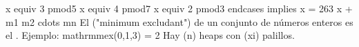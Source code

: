 {}x \markdownRendererBackslash{}equiv 3 \markdownRendererBackslash{}pmod\markdownRendererLeftBrace{}5\markdownRendererRightBrace{} \markdownRendererBackslash{}\markdownRendererBackslash{}\markdownRendererSoftLineBreak
{}x \markdownRendererBackslash{}equiv 4 \markdownRendererBackslash{}pmod\markdownRendererLeftBrace{}7\markdownRendererRightBrace{} \markdownRendererBackslash{}\markdownRendererBackslash{}\markdownRendererSoftLineBreak
{}x \markdownRendererBackslash{}equiv 2 \markdownRendererBackslash{}pmod\markdownRendererLeftBrace{}3\markdownRendererRightBrace{}\markdownRendererSoftLineBreak
{}\markdownRendererBackslash{}end\markdownRendererLeftBrace{}cases\markdownRendererRightBrace{}\markdownRendererSoftLineBreak
{}\markdownRendererBackslash{}implies\markdownRendererSoftLineBreak
{}x = 263\markdownRendererSoftLineBreak
{}\markdownRendererDollarSign{}\markdownRendererDollarSign{}\markdownRendererParagraphSeparator
{}\markdownRendererParagraphSeparator
{}\markdownRendererDollarSign{}\markdownRendererDollarSign{}\markdownRendererSoftLineBreak
{}x + m\markdownRendererUnderscore{}1 m\markdownRendererUnderscore{}2 \markdownRendererBackslash{}cdots m\markdownRendererUnderscore{}n\markdownRendererSoftLineBreak
{}\markdownRendererDollarSign{}\markdownRendererDollarSign{}\markdownRendererInterblockSeparator
{}\markdownRendererInterblockSeparator
{}
\markdownRendererSectionEnd 
\markdownRendererSectionEnd \markdownRendererSectionBegin
{}\markdownRendererInterblockSeparator
{}El  ("minimum excludant") de un conjunto de números enteros es el .\markdownRendererParagraphSeparator
{}Ejemplo: \markdownRendererDollarSign{}\markdownRendererBackslash{}mathrm\markdownRendererLeftBrace{}mex\markdownRendererRightBrace{}(\markdownRendererLeftBrace{}0,1,3\markdownRendererRightBrace{}) = 2\markdownRendererDollarSign{}\markdownRendererInterblockSeparator
{}\markdownRendererInterblockSeparator
{}
\markdownRendererSectionEnd 
\markdownRendererSectionEnd \markdownRendererSectionBegin
{}\markdownRendererInterblockSeparator
{}\markdownRendererUlBeginTight
\markdownRendererUlItem Hay (n) heaps con (x\markdownRendererUnderscore{}i) palillos.\markdownRendererUlItemEnd 

